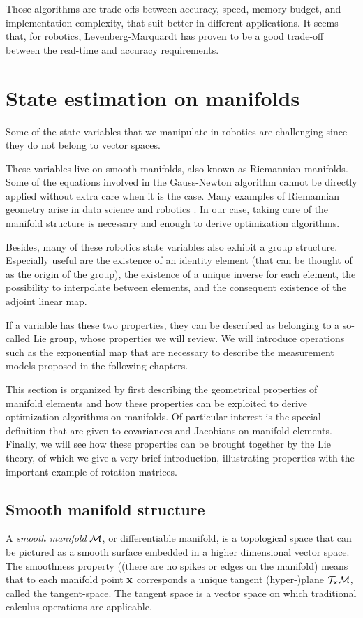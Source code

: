 Those algorithms are trade-offs between accuracy, speed, memory budget, and implementation complexity, 
that suit better in different applications. It seems that, for robotics, Levenberg-Marquardt has proven to be a good trade-off between the real-time and
accuracy requirements. 







\section{State estimation on manifolds}
Some of the state variables that we manipulate in robotics are challenging since they do not belong to vector spaces. 

These variables live on smooth manifolds, also known as Riemannian manifolds. 
Some of the equations involved in the Gauss-Newton algorithm cannot be directly applied without extra care when it is the case.
Many examples of Riemannian geometry arise in data science and robotics \cite{miolane2020geomstats}. 
In our case, taking care of the manifold structure is necessary and enough to derive optimization algorithms.

Besides, many of these robotics state variables also exhibit a group structure.
Especially useful are the existence of an identity element (that can be thought of as the origin of the group), 
the existence of a unique inverse for each element, the possibility to interpolate between elements, and
the consequent existence of the adjoint linear map.

If a variable has these two properties, they can be described as belonging to a so-called Lie group, whose properties we will review.
We will introduce operations such as the exponential map that are necessary to describe the measurement models proposed in the following chapters.

This section is organized by first describing the geometrical properties of manifold elements and how these properties
can be exploited to derive optimization algorithms on manifolds. Of particular interest is the special definition that are given to 
covariances and Jacobians on manifold elements. Finally, we will see how these properties can be brought together by the Lie theory, of which
we give a very brief introduction, illustrating properties with the important example of rotation matrices.



\subsection{Smooth manifold structure}
\label{sec:manifold_structure}
A \textit{smooth manifold} $\mathcal{M}$, or differentiable manifold, is a topological space that can be pictured as a smooth surface embedded in a higher dimensional vector space.
The smoothness property ((there are no spikes or edges on the manifold) means that to each manifold point ${\bf x}$ corresponds a unique tangent \mbox{(hyper-)plane} $\mathcal{T}_{{\bf x}}\mathcal{M}$, called the tangent-space. The tangent space is a vector space on which traditional calculus operations are applicable. 

